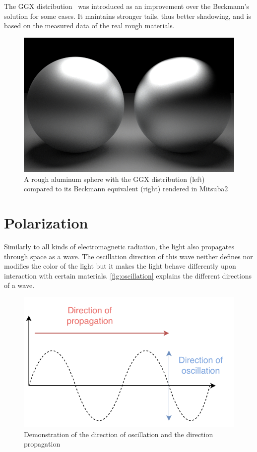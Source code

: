 The GGX distribution~\cite{walter2007microfacet} was introduced as an improvement over the Beckmann's solution for some cases. It maintains stronger tails, thus better shadowing, and is based on the measured data of the real rough materials.

\begin{figure}[h]
	\centering
	\includegraphics[width=.8\linewidth]{img/ggx_beckmann.png}
	\caption{A rough aluminum sphere with the GGX distribution (left) compared to its Beckmann equivalent (right) rendered  in Mitsuba2}
	\label{fig:ggx_beckmann}
\end{figure}

\section{Polarization}
\label{sec:polarization}

Similarly to all kinds of electromagnetic radiation, the light also propagates through space as a wave. The oscillation direction of this wave neither defines nor modifies the color of the light but it makes the light behave differently upon interaction with certain materials. \autoref{fig:oscillation} explains the different directions of a wave.

\begin{figure}[h]
	\centering
	\includegraphics[width=.6\linewidth]{img/oscillation.pdf}
	\caption{Demonstration of the direction of oscillation and the direction propagation}
	\label{fig:oscillation}
\end{figure}

